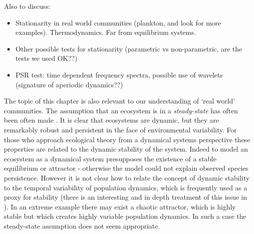 
Also to discuss:
\begin{itemize}
	\item Stationarity in real world communities (plankton, and look for more examples). Thermodynamics. Far from equilibrium systems.
	\item Other possible tests for stationarity (parametric vs non-parametric, are the tests we used OK??)
	\item PSR test: time dependent frequency spectra, possible use of wavelets (signature of aperiodic dynamics??)
\end{itemize}


The topic of this chapter is also relevant to our understanding of `real world' communities. The assumption that an ecosystem is in a \emph{steady-state} has often been often made \cite{brock1967ecosystem}. It is clear that ecosystems are dynamic, but they are remarkably robust and persistent in the face of environmental variability. For those who approach ecological theory from a dynamical systems perspective these properties are related to the dynamic stability of the system. Indeed to model an ecosystem as a dynamical system presupposes the existence of a stable equilibrium or attractor - otherwise the model could not explain observed species persistence. However it is not clear how to relate the concept of dynamic stability to the temporal variability of population dynamics, which is frequently used as a proxy for stability (there is an interesting and in depth treatment of this issue in \cite{arnoldi2015}). In an extreme example there may exist a chaotic attractor, which is highly stable but which creates highly variable population dynamics. In such a case the steady-state assumption does not seem appropriate. 


